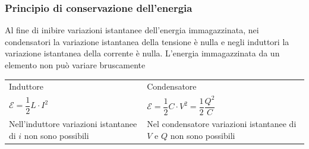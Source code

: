\documentclass{article}
\begin{document}
\subsubsection{Principio di conservazione dell'energia}
Al fine di inibire variazioni istantanee dell'energia immagazzinata, nei
condensatori la variazione istantanea della tensione è nulla e negli induttori la
variazione istantanea della corrente è nulla. L'energia immagazzinata da un elemento non può variare bruscamente
\begin{center}
\begin{tabular}{m{7cm} m{7cm}}
    Induttore & Condensatore\\
    $\mathcal{E} = \dfrac{1}{2} L \cdot I^2$ & $\mathcal{E} = \dfrac{1}{2}C \cdot V^2 = \dfrac{1}{2}\dfrac{Q^2}{C}$\\
    Nell'induttore variazioni istantanee di $i$ non sono possibili & Nel condensatore variazioni istantanee di $V$ e $Q$ non sono possibili
\end{tabular}
\end{center}
\end{document}

